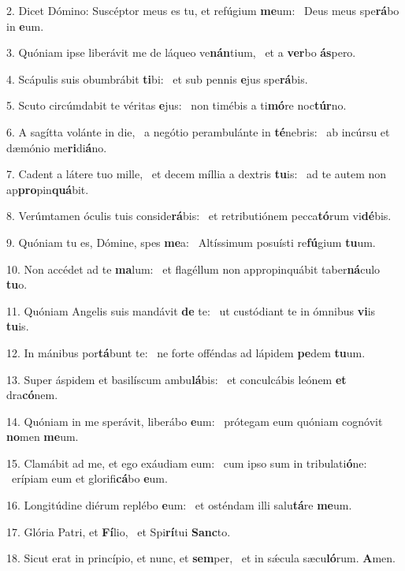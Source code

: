 2. Dicet Dómino: Suscéptor meus es tu, et refúgium \textbf{me}um: \ast\  Deus meus spe\textbf{rá}bo in \textbf{e}um.\

3. Quóniam ipse liberávit me de láqueo ve\textbf{nán}tium, \ast\  et a \textbf{ver}bo \textbf{ás}pero.\

4. Scápulis suis obumbrábit \textbf{ti}bi: \ast\  et sub pennis \textbf{e}jus spe\textbf{rá}bis.\

5. Scuto circúmdabit te véritas \textbf{e}jus: \ast\  non timébis a ti\textbf{mó}re noc\textbf{túr}no.\

6. A sagítta volánte in die, \dag\  a negótio perambulánte in \textbf{té}nebris: \ast\  ab incúrsu et dæmónio me\textbf{ri}di\textbf{á}no.\

7. Cadent a látere tuo mille, \dag\  et decem míllia a dextris \textbf{tu}is: \ast\  ad te autem non ap\textbf{pro}pin\textbf{quá}bit.\

8. Verúmtamen óculis tuis conside\textbf{rá}bis: \ast\  et retributiónem pecca\textbf{tó}rum vi\textbf{dé}bis.\

9. Quóniam tu es, Dómine, spes \textbf{me}a: \ast\  Altíssimum posuísti re\textbf{fú}gium \textbf{tu}um.\

10. Non accédet ad te \textbf{ma}lum: \ast\  et flagéllum non appropinquábit taber\textbf{ná}culo \textbf{tu}o.\

11. Quóniam Angelis suis mandávit \textbf{de} te: \ast\  ut custódiant te in ómnibus \textbf{vi}is \textbf{tu}is.\

12. In mánibus por\textbf{tá}bunt te: \ast\  ne forte offéndas ad lápidem \textbf{pe}dem \textbf{tu}um.\

13. Super áspidem et basilíscum ambu\textbf{lá}bis: \ast\  et conculcábis leónem \textbf{et} dra\textbf{có}nem.\

14. Quóniam in me sperávit, liberábo \textbf{e}um: \ast\  prótegam eum quóniam cognóvit \textbf{no}men \textbf{me}um.\

15. Clamábit ad me, et ego exáudiam eum: \dag\  cum ipso sum in tribulati\textbf{ó}ne: \ast\  erípiam eum et glorifi\textbf{cá}bo \textbf{e}um.\

16. Longitúdine diérum replébo \textbf{e}um: \ast\  et osténdam illi salu\textbf{tá}re \textbf{me}um.\

17. Glória Patri, et \textbf{Fí}lio, \ast\  et Spi\textbf{rí}tui \textbf{Sanc}to.\

18. Sicut erat in princípio, et nunc, et \textbf{sem}per, \ast\  et in sǽcula sæcu\textbf{ló}rum. \textbf{A}men.\

